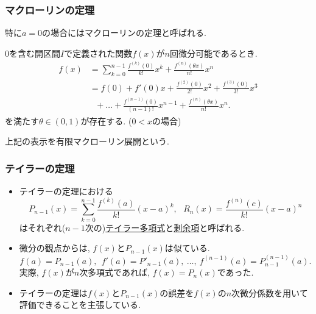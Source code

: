 \begin{frame}
\frametitle{マクローリンの定理}


特に$a=0$の場合にはマクローリンの定理と呼ばれる. 


\begin{Thm}[マクローリンの定理]  \label{マクローリン}
$0$を含む開区間$I$で定義された関数$f(x)$が$n$回微分可能であるとき. 
 \begin{align*}
f(x) & = \sum_{k=0}^{n-1}\frac{f^{(k)}(0)}{k!}x^k + \frac{f^{(n)}(\theta x)}{n!}x^n \\
& =  f(0)+ f'(0)x + \frac{f^{(2)}(0)}{2!}x^2  + \frac{f^{(3)}(0)}{3!}x^3 \\
& \ \ \ + \dots + \frac{f^{(n-1)}(0)}{(n-1)!}x^{n-1}+\frac{f^{(n)}(\theta x)}{n!}x^n . 
\end{align*}
を満たす$\theta \in (0,1)$が存在する. ($0<x$の場合) 
\end{Thm}
上記の表示を有限マクローリン展開という.

\end{frame}





\begin{frame}
\frametitle{テイラーの定理}


\begin{itemize}
\item テイラーの定理における
$$
P_{n-1}(x)=\sum_{k=0}^{n-1}\frac{f^{(k)}(a)}{k!}(x-a)^k, \ \ \ 
R_n(x)=\frac{f^{(n)}(c)}{k!}(x-a)^n
$$
はそれぞれ($n-1$次の)\underline{テイラー多項式}と\underline{剰余項}と呼ばれる. 
\item 微分の観点からは, $f(x)$と$P_{n-1}(x)$は似ている. 
$$
f(a)=P_{n-1}(a), \ \ f '(a)=P'_{n-1}(a), \ \dots, \  f^{(n-1)}(a)=P^{(n-1)}_{n-1}(a). 
$$
実際, $f(x)$が$n$次多項式であれば, $f(x)=P_n(x)$であった. 
\item テイラーの定理は$f(x)$と$P_{n-1}(x)$の誤差を$f(x)$の$n$次微分係数を用いて評価できることを主張している. 
\end{itemize}

\end{frame}






